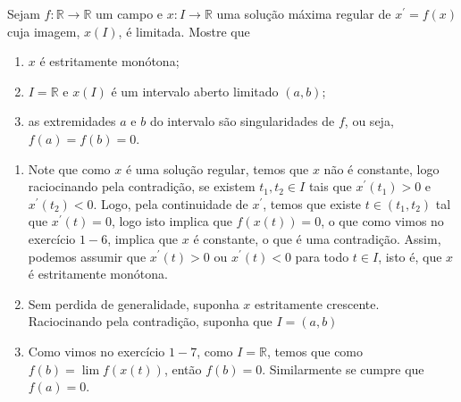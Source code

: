 \begin{homeworkProblem}[1-8]
  Sejam $f:\mathbb{R}\to\mathbb{R}$ um campo e $x:I\to\mathbb{R}$ uma solução máxima regular de $x^{\prime} = f(x)$ cuja imagem, $x(I)$, é limitada. Mostre que
  \begin{enumerate}
    \item $x$ é estritamente monótona;
    \item $I = \mathbb{R}$ e $x(I)$ é um intervalo aberto limitado $(a,b)$;
    \item as extremidades $a$ e $b$ do intervalo são singularidades de $f$, ou seja, $f(a) = f(b) = 0$.
  \end{enumerate}
  \begin{solution}
  \begin{enumerate}
    \item Note que como $x$ é uma solução regular, temos que $x$ não é constante, logo raciocinando pela contradição, se existem $t_1,t_2\in I$ tais que $x^{\prime}(t_1)>0$ e $x^{\prime}(t_2)<0$. Logo, pela continuidade de $x^{\prime}$, temos que existe $t\in (t_1,t_2)$ tal que $x^{\prime}(t)=0$, logo isto implica que $f(x(t))=0$, o que como vimos no exercício $1-6$, implica que $x$ é constante, o que é uma contradição. Assim, podemos assumir que $x^{\prime}(t)>0$ ou $x^{\prime}(t)<0$ para todo $t\in I$, isto é, que $x$ é estritamente monótona.
    \item Sem perdida de generalidade, suponha $x$ estritamente crescente.\\
      Raciocinando pela contradição, suponha que $I=(a,b)$
    \item Como vimos no exercício $1-7$, como $I=\mathbb{R}$, temos que como $f(b)=\lim f(x(t))$, então $f(b)=0$. Similarmente se cumpre que $f(a)=0$.
  \end{enumerate} 
  \end{solution}
\end{homeworkProblem}
